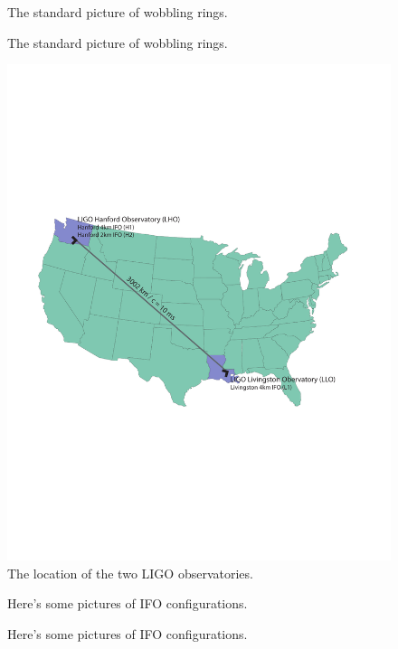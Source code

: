 \begin{figure}[p]
\begin{center}
The standard picture of wobbling rings.
\end{center}
\caption{\label{f:rings}%
The standard picture of wobbling rings.
}
\end{figure}

\begin{figure}[p]
\begin{center}
\includegraphics[width=\linewidth]{figures/inspiral/observatories}
\end{center}
\caption{\label{f:usmap}%
The location of the two LIGO observatories.
}
\end{figure}

\begin{figure}[p]
\begin{center}
Here's some pictures of IFO configurations.
\end{center}
\caption{\label{f:ifodesign}%
Here's some pictures of IFO configurations.
}
\end{figure}

